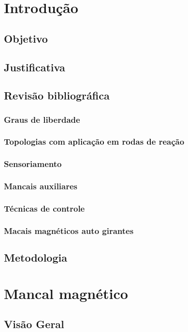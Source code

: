 \documentclass[a4paper,10pt]{report}
\begin{document}
\renewcommand\contentsname{Sumário Estruturado da Dissertação}
\tableofcontents


\chapter{Introdução}\label{intro}
\section{Objetivo}
\section{Justificativa}
\section{Revisão bibliográfica}
\subsection{Graus de liberdade}
\subsection{Topologias com aplicação em rodas de reação}
\subsection{Sensoriamento}
\subsection{Mancais auxiliares}
\subsection{Técnicas de controle}
\subsection{Macais magnéticos auto girantes}
\section{Metodologia}

\chapter{Mancal magnético}
\section{Visão Geral}
\end{document}
